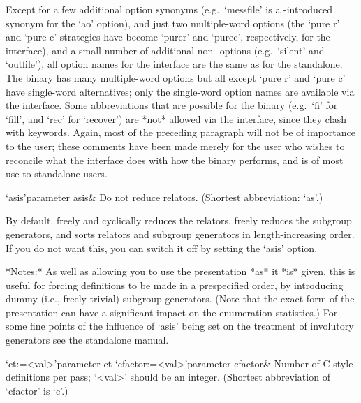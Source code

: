 Except for a few additional option synonyms (e.g.~`messfile' is a 
{\GAP}-introduced synonym for the `ao' {\ACE} option), and just two
multiple-word {\ACE} options (the `pure r' and `pure c' strategies
have become `purer' and `purec', respectively, for the {\GAP} interface),
and a small number of additional non-{\ACE} options (e.g.~`silent'
and `outfile'), all option names for the interface are the same as for
the {\ACE} standalone. The {\ACE} binary has many multiple-word options
but all except `pure r' and `pure c' have single-word alternatives;
only the single-word option names are available via the {\GAP} interface.
Some abbreviations that are possible for the {\ACE} binary (e.g.~`fi'
for `fill', and `rec' for `recover') are *not* allowed via the {\GAP}
interface, since they clash with {\GAP} keywords. Again, most of the
preceding paragraph will not be of importance to the {\GAP} user;
these comments have been made merely for the user who wishes to reconcile
what the interface does with how the {\ACE} binary performs, and is
of most use to standalone users.


\beginitems
\>`asis'{parameter asis}&
Do not reduce relators. (Shortest abbreviation: `as'.)
\enditems

By default, {\ACE} freely  and cyclically reduces the relators, freely
reduces  the  subgroup generators,  and  sorts  relators and  subgroup
generators in length-increasing  order.  If you do not  want this, you
can switch it off by setting the `asis' option.

*Notes:* As well as allowing you  to use the presentation *as* it *is*
given,  this  is  useful for  forcing  definitions  to  be made  in  a
prespecified  order,  by  introducing  dummy  (i.e.,  freely  trivial)
subgroup generators.   (Note that the  exact form of  the presentation
can  have a significant  impact on  the enumeration  statistics.)  For
some fine points of the influence of `asis' being set on the treatment
of involutory generators see the {\ACE} standalone manual.



\beginitems

\>`ct:=<val>'{parameter ct}
\>`cfactor:=<val>'{parameter cfactor}&
Number of C-style definitions per pass; `<val>' should be an  integer. 
(Shortest abbreviation of `cfactor' is `c'.)

